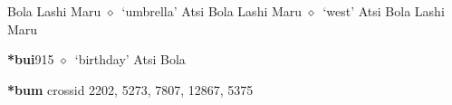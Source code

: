 \begin{list}{}{\leftmargin=1.5em \itemindent=-1.5em}
         Bola 
\hspace{1ex}
         Lashi 
\hspace{1ex}
         Maru 
\hspace{1ex}
         $\diamond$~`umbrella'
         Atsi 
\hspace{1ex}
         Bola 
\hspace{1ex}
         Lashi 
\hspace{1ex}
         Maru 
\hspace{1ex}
         $\diamond$~`west'
         Atsi 
\hspace{1ex}
         Bola 
\hspace{1ex}
         Lashi 
\hspace{1ex}
         Maru 
  \item {\footnotesize \textbf{*bui}}{\tiny 915}
\hspace{1ex}
         $\diamond$~`birthday'
         Atsi 
\hspace{1ex}
         Bola 
  \end{list}
\item
\textbf{*bum}
  {\tiny crossid 2202, 5273, 7807, 12867, 5375}
